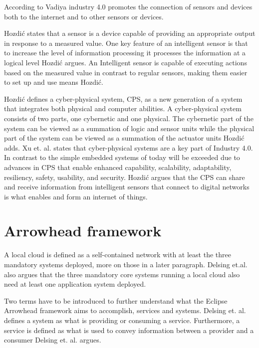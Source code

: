 According to Vadiya industry 4.0 promotes the connection of sensors and devices both to the internet and to other sensors or devices.\cite{Vaidya2018} 

Hozdić states that a sensor is a device capable of providing an appropriate output in response to a measured value.
One key feature of an intelligent sensor is that to increase the level of information processing it processes the information at a logical level Hozdić argues.
An Intelligent sensor  is capable of executing actions based on the measured value in contrast to regular sensors, making them easier to set up and use means Hozdić.\cite{Hozdic2015} 

Hozdić defines a cyber-physical system, CPS, as a new generation of a system that integrates both physical and computer abilities.
A cyber-physical system consists of two parts, one cybernetic and one physical.
The cybernetic part of the system can be viewed as a summation of logic and sensor units while the physical part of the system can be viewed as a summation of the actuator units Hozdić adds.
Xu et. al. states that cyber-physical systems are a key part of Industry 4.0. In contrast to the simple embedded systems of today will be exceeded due to advances in CPS that enable enhanced capability, scalability, adaptability, resiliency, safety, usability, and security.\cite{Xu2018}
Hozdić argues that the CPS can share and receive information from intelligent sensors that connect to digital networks is what enables and form an internet of things.\cite{Hozdic2015}
 
\section{Arrowhead framework}
A local cloud is defined as a self-contained network with at least the three mandatory systems deployed, more on those in a later paragraph. 
Delsing et.al. also argues that the three mandatory core systems running a local cloud also need at least one application system deployed.\cite{Delsing2017}

Two terms have to be introduced to further understand what the Eclipse Arrowhead framework aims to accomplish, services and systems.
Delsing et. al. defines a system as what is providing or consuming a service.
Furthermore, a service is defined as what is used to convey information between a provider and a consumer Delsing et. al. argues.\cite{Delsing2017}

